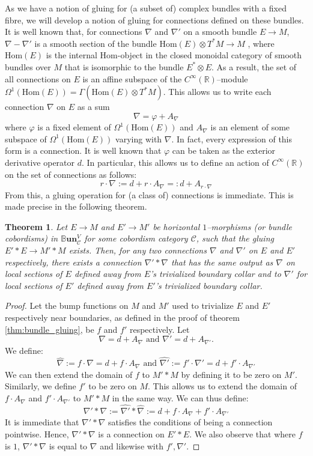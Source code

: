 \documentclass{amsart}
\newcommand{\R}{\mathbb{R}}
\newcommand{\s}{\mathscr}
\newcommand{\wh}{\widehat}
\newcommand{\tensor}{\otimes}
\renewcommand{\to}[1][]{\stackrel{#1}{\longrightarrow}}
\newcommand{\Hom}{\text{Hom}}
\newcommand{\BBun}{\mathbb{B}\textbf{un}}
\newcommand{\Cinf}{C^{\infty}}
\newtheorem{thm}{Theorem}
\numberwithin{thm}{section}
\theoremstyle{definition}
\begin{document}
As we have a notion of gluing for (a subset of) complex bundles with a fixed
fibre, we will develop a notion of gluing for connections defined on these
bundles. It is well known that, for connections $\nabla$ and $\nabla'$ on a
smooth bundle $E \to M$, $\nabla - \nabla'$ is a smooth section of the bundle
$\Hom(E) \tensor T^*M \to M$ \cite[Lemma 2.2]{Conn},
where $\Hom(E)$ is the internal $\Hom$-object in
the closed monoidal category of smooth bundles over $M$ that is isomorphic to
the bundle $E^* \tensor E$. As a result, the set of all
connections on $E$ is an affine subspace of the $\Cinf(\R)$--module
$\Omega^1(\Hom(E)) = \Gamma(\Hom(E) \tensor T^*M)$. This allows us to write each
connection $\nabla$ on $E$ as a sum
\[
  \nabla = \varphi + A_{\nabla}
\]
where $\varphi$ is a fixed element of $\Omega^1(\Hom(E))$ and $A_{\nabla}$
is an element of some subspace of $\Omega^1(\Hom(E))$ varying with $\nabla$. In
fact, every expression of this form is a connection. It is well known that
$\varphi$ can be taken as the exterior derivative operator $d$. In particular,
this allows us to define an action of $\Cinf(\R)$ on the set of connections as
follows:
\[
  r \cdot \nabla := d + r \cdot A_{\nabla} =: d + A_{r \cdot \nabla}
\]
From this, a gluing operation for (a class of) connections is immediate. This
is made precise in the following theorem.

\begin{thm}
Let $E \to M$ and $E' \to M'$ be horizontal $1$--morphisms
(or bundle cobordisms) in $\BBun^V_{\s{C}}$ for some cobordism category $\s{C}$,
such that the gluing $E' * E \to M' * M$ exists. Then, for any two connections
$\nabla$ and $\nabla'$ on $E$ and $E'$ respectively, there exists a connection
$\nabla' * \nabla$ that has the same output as $\nabla$ on local sections of $E$
defined away from $E$'s trivialized boundary collar and to $\nabla'$ for local
sections of $E'$ defined away from $E'$'s trivialized boundary collar.
\end{thm}
\begin{proof}
Let the bump functions on $M$ and $M'$ used to trivialize $E$ and $E'$
respectively near boundaries, as defined in the proof of theorem
\ref{thm:bundle_gluing}, be $f$ and $f'$ respectively. Let
\[
  \nabla = d + A_{\nabla} \text{ and } \nabla' = d + A_{\nabla'}.
\]
We define:
\[
  \wh{\nabla} := f \cdot \nabla = d + f \cdot A_{\nabla}
  \text{ and } \wh{\nabla'} := f' \cdot \nabla' = d + f' \cdot A_{\nabla'}
\]
We can then extend the domain of $f$ to $M' * M$ by defining it to be zero on
$M'$. Similarly, we define $f'$ to be zero on $M$. This allows us to extend the
domain of $f \cdot A_{\nabla}$ and $f' \cdot A_{\nabla'}$ to $M' * M$ in the
same way. We can thus define:
\[
  \nabla' * \nabla := \wh{\nabla'} * \wh{\nabla}
    := d + f \cdot A_{\nabla} + f' \cdot A_{\nabla'}
\]
It is immediate that $\nabla' * \nabla$ satisfies the conditions of being a
connection pointwise. Hence, $\nabla' * \nabla$ is a connection on $E' * E$. We
also observe that where $f$ is $1$, $\nabla' * \nabla$ is equal to $\nabla$ and
likewise with $f', \nabla'$.
\end{proof}
\end{document}
